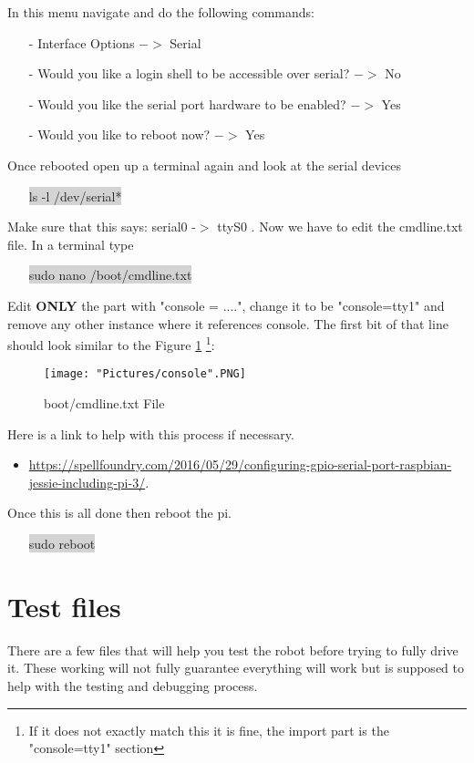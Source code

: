 \documentclass[12pt]{article}
\begin{document}
\noindent In this menu navigate and do the following commands:
\begin{itemize}
	\item[-]  Interface Options $-> $ Serial 
	\item[-] Would you like a login shell to be accessible over serial? $->$ No
	\item[-] Would you like the serial port hardware to be enabled? $->$ Yes
	\item[-] Would you like to reboot now? $->$ Yes
\end{itemize} 
\noindent Once rebooted open up a terminal again and look at the serial devices	
\begin{itemize}
	\item[] \colorbox{lightgray}{ls -l /dev/serial*}
\end{itemize}
Make sure that this says: serial0 -$>$ ttyS0 . Now we have to edit the cmdline.txt file. In a terminal type
\begin{itemize}
	\item [] \colorbox{lightgray}{sudo nano /boot/cmdline.txt}
\end{itemize}

\noindent Edit \textbf{ONLY} the part with "console = ....", change it to be "console=tty1" and remove any other instance where it references console. The first bit of that line should look similar to the Figure \ref{console} \footnote{If it does not exactly match this it is fine, the import part is the "console=tty1" section}:

\begin{figure}[H]
 	\centering
	\texttt{[image: "Pictures/console".PNG]}
 	\caption{boot/cmdline.txt File}
	\label{console}
\end{figure}

\noindent Here is a link to help with this process if necessary.
\begin{itemize}
	\item \href{https://spellfoundry.com/2016/05/29/configuring-gpio-serial-port-raspbian-jessie-including-pi-3/}{https://spellfoundry.com/2016/05/29/configuring-gpio-serial-port-raspbian-jessie-including-pi-3/}. 
\end{itemize}
\noindent Once this is all done then reboot the pi.
\begin{itemize}
	\item[] \colorbox{lightgray}{sudo reboot}
\end{itemize}


\section{Test files}
There are a few files that will help you test the robot before trying to fully drive it. These working will not fully guarantee everything will work but is supposed to help with the testing and debugging process.
\end{document}
